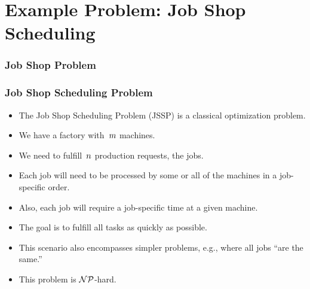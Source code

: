 \documentclass[mathserif]{beamer}%
\begin{document}
\section{Example Problem: Job Shop Scheduling}%
%
\begin{frame}%
\frametitle{Job Shop Problem}%
%
%
%
%
%
%
%
%
%
%
%
%
%
\end{frame}%
%
\begin{frame}%
\frametitle{Job Shop Scheduling Problem}%
\begin{itemize}%
\item The Job Shop Scheduling Problem (JSSP)\cite{GLLRK1979OAAIDSASAS,LLRKS1993SASAAC,L1982RRITTOMS,T199BFBSP,BDP1996TJSSPCANST} is a classical optimization problem.%
\item<2-> We have a factory with~$m$ machines.%
\item<3-> We need to fulfill~$n$ production requests, the \alert{jobs}.%
\item<4-> Each job will need to be processed by some or all of the machines in a job-specific order.%
\item<5-> Also, each job will require a job-specific time at a given machine.%
\item<6-> The goal is to fulfill all tasks as quickly as possible.%
\item<7-> This scenario also encompasses simpler problems, e.g., where all jobs ``are the same.''%
\item<8-> This problem is \mbox{$\mathcal{NP}$-hard}.\cite{K1972RACP,C1971TCOTPP}%
\end{itemize}%
\end{frame}%
\end{document}

